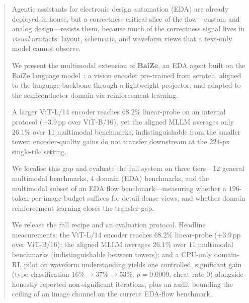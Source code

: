 ﻿\begin{abstract}
Agentic assistants for electronic design automation (EDA) are already deployed in-house, but a correctness-critical slice of the flow---custom and analog design---resists them, because much of the correctness signal lives in \emph{visual} artifacts: layout, schematic, and waveform views that a text-only model cannot observe.

We present the multimodal extension of \textbf{BaiZe}, an EDA agent built on the BaiZe language model~\cite{baiZe-llm}: a vision encoder pre-trained from scratch, aligned to the language backbone through a lightweight projector, and adapted to the semiconductor domain via reinforcement learning.

A larger ViT-L/14 encoder reaches $68.2\%$ linear-probe on an internal protocol ($+3.9$\,pp over ViT-B/16), yet the aligned MLLM averages only $26.1\%$ over 11 multimodal benchmarks, indistinguishable from the smaller tower: encoder-quality gains do not transfer downstream at the $224$-px single-tile setting.

We localise this gap and evaluate the full system on three tiers---12 general multimodal benchmarks, 4 domain (EDA) benchmarks, and the multimodal subset of an EDA flow benchmark---measuring whether a $196$-token-per-image budget suffices for detail-dense views, and whether domain reinforcement learning closes the transfer gap.

We release the full recipe and an evaluation protocol. Headline measurements: the ViT-L/14 encoder reaches $68.2\%$ linear-probe ($+3.9$\,pp over ViT-B/16); the aligned MLLM averages $26.1\%$ over $11$ multimodal benchmarks (indistinguishable between towers); and a CPU-only domain-RL pilot on waveform understanding yields one controlled, significant gain (type classification $16\%\to37\%\to53\%$, $p{=}0.0009$, cheat rate $0$) alongside honestly reported non-significant iterations, plus an audit bounding the ceiling of an image channel on the current EDA-flow benchmark.
\end{abstract}